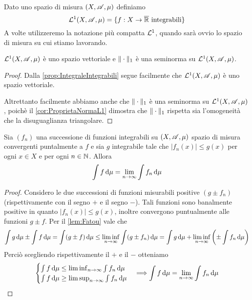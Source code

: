 \begin{definition}
	Dato uno spazio di misura $(X,\mathscr A,\mu)$ definiamo
	\begin{equation*}
		\mathcal L^1(X,\mathscr A,\mu)=\{ f:X\to\overline{\mathbb R} \text{ integrabili} \}
	\end{equation*}
	A volte utilizzeremo la notazione più compatta $\mathcal L^1$, quando sarà ovvio lo spazio di misura su cui stiamo lavorando.
\end{definition}

\begin{proposition}\label{prop:L1VettorialeConSeminorma}
	$\mathcal L^1(X,\mathscr A,\mu)$ è uno spazio vettoriale e $\Vert \cdot\Vert_1$ è una seminorma su $\mathcal L^1(X,\mathscr A,\mu)$.
\end{proposition}
\begin{proof}
	Dalla \cref{prop:IntegraleIntegrabili} segue facilmente che $\mathcal L^1(X,\mathscr A,\mu)$ è uno spazio vettoriale. 
	
	Altrettanto facilmente abbiamo anche che $\Vert \cdot\Vert_1$ è una seminorma su $\mathcal L^1(X,\mathscr A,\mu)$, poichè il \cref{cor:ProprietaNormaL1} dimostra che $\Vert \cdot\Vert_1$ rispetta sia l'omogeneità che la disuguaglianza triangolare.
\end{proof}

\begin{theorem}\label{thm:ConvergenzaDominata}
	Sia $(f_n)$ una successione di funzioni integrabili su $(X,\mathscr A,\mu)$ spazio di misura convergenti puntalmente a $f$ e sia $g$ integrabile tale che $|f_n(x)|\le g(x)$ per ogni $x\in X$ e per ogni $n\in\mathbb N$. Allora
	\begin{equation*}
		\int f \,\mathrm d\mu=\lim_{n\to\infty}\int f_n\,\mathrm d\mu
	\end{equation*}
\end{theorem}

\begin{proof}
	Considero le due successioni di funzioni misurabili positive $(g\pm f_n)$ (rispettivamente con il segno $+$ e il segno $-$). Tali funzioni sono banalmente positive in quanto $|f_n(x)|\le g(x)$, inoltre convergono puntualmente alle funzioni $g\pm f$. Per il \cref{lem:Fatou} vale che
	\begin{equation*}
		\int g\,\mathrm d\mu\pm\int f\,\mathrm d\mu=\int (g\pm f) \,\mathrm d\mu \le \liminf_{n\to\infty} \int (g\pm f_n) \,\mathrm d\mu=\int g\,\mathrm d\mu +\liminf_{n\to\infty}\left( \pm\int f_n \,\mathrm d \mu\right)
	\end{equation*}
	Perciò scegliendo rispettivamente il $+$ e il $-$ otteniamo
	\begin{equation*}
		\begin{cases}
			\int f \,\mathrm d\mu\le \liminf_{n\to\infty}\int f_n \,\mathrm d \mu \\
			\int f\,\mathrm d\mu \ge \limsup_{n\to\infty}\int f_n \,\mathrm d \mu
		\end{cases}
		\Longrightarrow \int f\,\mathrm d\mu = \lim_{n\to\infty}\int f_n \,\mathrm d \mu
	\end{equation*}

\end{proof}

